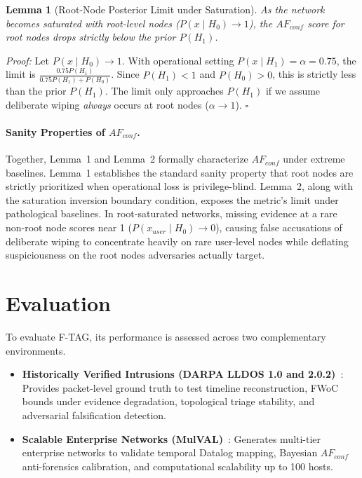 \documentclass[12pt]{article}
\newtheorem{lemma}{Lemma}
\begin{document}
\begin{lemma}[Root-Node Posterior Limit under Saturation]
As the network becomes saturated with root-level nodes ($P(x \mid H_0) \to 1$), the $AF_{conf}$ score for root nodes drops strictly below the prior $P(H_1)$.
\end{lemma}

\textit{Proof:} Let $P(x \mid H_0) \to 1$. With operational setting $P(x \mid H_1) = \alpha = 0.75$, the limit is $\frac{0.75 P(H_1)}{0.75 P(H_1) + P(H_0)}$. Since $P(H_1) < 1$ and $P(H_0) > 0$, this is strictly less than the prior $P(H_1)$. The limit only approaches $P(H_1)$ if we assume deliberate wiping \textit{always} occurs at root nodes ($\alpha \to 1$). $\square$

\paragraph{Sanity Properties of $AF_{conf}$.}
Together, Lemma~1 and Lemma~2 formally characterize $AF_{conf}$ under extreme baselines. Lemma~1 establishes the standard sanity property that root nodes are strictly prioritized when operational loss is privilege-blind. Lemma~2, along with the saturation inversion boundary condition, exposes the metric's limit under pathological baselines. In root-saturated networks, missing evidence at a rare non-root node scores near 1 ($P(x_{user} \mid H_0) \to 0$), causing false accusations of deliberate wiping to concentrate heavily on rare user-level nodes while deflating suspiciousness on the root nodes adversaries actually target.

\section{Evaluation}\label{sec:evaluation}

To evaluate F-TAG, its performance is assessed across two complementary environments.
\begin{itemize}
    \item \textbf{Historically Verified Intrusions (DARPA LLDOS 1.0 and 2.0.2)}~\cite{haines2001extending,darpa2000lldos}: Provides packet-level ground truth to test timeline reconstruction, FWoC bounds under evidence degradation, topological triage stability, and adversarial falsification detection.
    \item \textbf{Scalable Enterprise Networks (MulVAL)}~\cite{mulval}: Generates multi-tier enterprise networks to validate temporal Datalog mapping, Bayesian $AF_{conf}$ anti-forensics calibration, and computational scalability up to 100 hosts.
\end{itemize}
\end{document}
